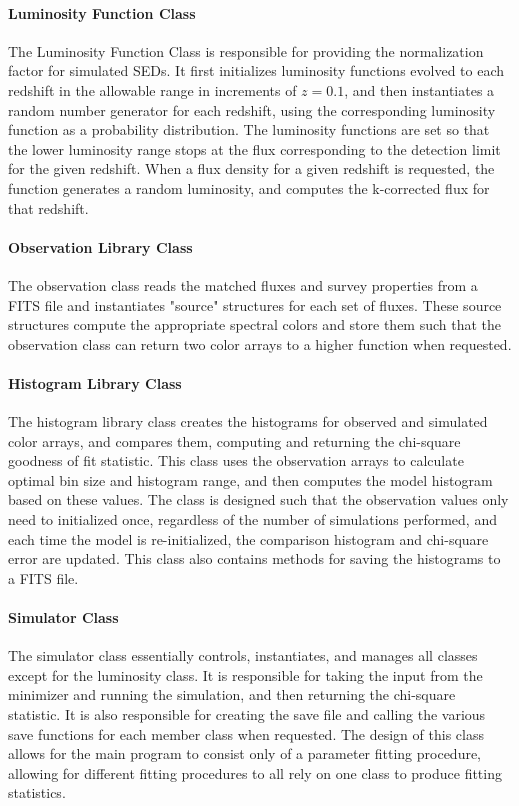 \documentclass[twocolumn,letterpaper,10pt]{article}
\begin{document}
\paragraph{Luminosity Function Class}
The Luminosity Function Class is responsible for providing the normalization factor for simulated SEDs. It first initializes luminosity functions evolved to each redshift in the allowable range in increments of $z=0.1$, and then instantiates a random number generator for each redshift, using the corresponding luminosity function as a probability distribution. The luminosity functions are set so that the lower luminosity range stops at the flux corresponding to the detection limit for the given redshift. When a flux density for a given redshift is requested, the function generates a random luminosity, and computes the k-corrected flux for that redshift.

\paragraph{Observation Library Class}
The observation class reads the matched fluxes and survey properties from a FITS file and instantiates "source" structures for each set of fluxes. These source structures compute the appropriate spectral colors and store them such that the observation class can return two color arrays to a higher function when requested.

\paragraph{Histogram Library Class}
The histogram library class creates the histograms for observed and simulated color arrays, and compares them, computing and returning the chi-square goodness of fit statistic. This class uses the observation arrays to calculate optimal bin size and histogram range, and then computes the model histogram based on these values. The class is designed such that the observation values only need to initialized once, regardless of the number of simulations performed, and each time the model is re-initialized, the comparison histogram and chi-square error are updated. This class also contains methods for saving the histograms to a FITS file.

\paragraph{Simulator Class}
The simulator class essentially controls, instantiates, and manages all classes except for the luminosity class. It is responsible for taking the input from the minimizer and running the simulation, and then returning the chi-square statistic. It is also responsible for creating the save file and calling the various save functions for each member class when requested. The design of this class allows for the main program to consist only of a parameter fitting procedure, allowing for different fitting procedures to all rely on one class to produce fitting statistics.
\end{document}
